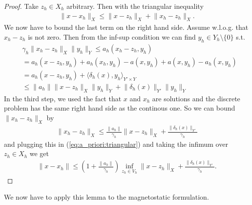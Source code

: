 \documentclass[../master_thesis.tex]{subfiles}
\begin{document}
\begin{proof}
    Take $z_h \in X_h$ arbitrary. Then with the triangular inequality
    \begin{align}
        \lVert x - x_h \rVert _X \leq \lVert x - z_h \rVert _X + \lVert x_h - z_h \rVert _X. \label{eq:a_priori:triangular}
    \end{align}
    We now have to bound the last term on the right hand side.
    Assume w.l.o.g. that $x_h - z_h$ is not zero. Then from the inf-sup condition 
    we can find $y_h \in Y_h \setminus \{0\}$ s.t. 
    \begin{align*}
        &\gamma_h \lVert x_h - z_h \rVert _X \lVert y_h \rVert _Y
        \leq a_h(x_h-z_h, y_h) 
        \\ &= a_h(x-z_h, y_h) + a_h(x_h, y_h) - a(x, y_h) + a(x, y_h) - a_h(x, y_h) 
        \\ &= a_h(x-z_h, y_h) + \langle \delta_h(x), y_h \rangle_{Y'\times Y} 
        \\ &\leq \lVert a_h \rVert \lVert x- z_h \rVert _X \lVert y_h \rVert _Y
            + \lVert \delta_h(x) \rVert _{Y'}  \lVert y_h \rVert _Y
    \end{align*}
    In the third step, we used the fact that $x$ and $x_h$ are solutions and the discrete 
    problem has the same right hand side as the continous one.
    So we can bound $\lVert x_h - z_h \rVert _X$ by 
    \begin{align*}
        \lVert x_h - z_h \rVert _X
        \leq \frac{\lVert a_h \rVert}{\gamma_h} \lVert x- z_h \rVert _X 
            + \frac{\lVert \delta_h(x) \rVert _{Y'}}{\gamma_h}  
    \end{align*}
    and plugging this in (\ref{eq:a_priori:triangular}) and taking the infimum 
    over $z_h \in X_h$ we get 
    \begin{align*}
        \lVert x - x_h \rVert 
        \leq \left( 1 + \frac{\lVert a_h \rVert}{\gamma_h} \right) \inf _{z_h \in V_h}\lVert x - z_h \rVert _X 
            + \frac{\lVert \delta_h(x) \rVert _{Y'}}{\gamma_h}.
    \end{align*}
\end{proof}

We now have to apply this lemma to the magnetostatic formulation.
\end{document}
